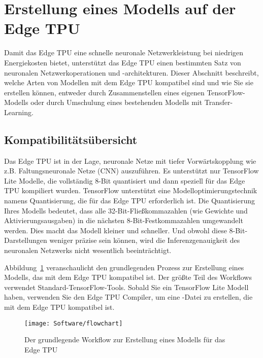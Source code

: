 \section{Erstellung eines Modells  auf der Edge TPU}
Damit das Edge TPU eine schnelle neuronale Netzwerkleistung bei niedrigen Energiekosten bietet, unterstützt das Edge TPU einen bestimmten Satz von neuronalen Netzwerkoperationen und -architekturen. Dieser Abschnitt beschreibt, welche Arten von Modellen mit dem Edge TPU kompatibel sind und wie Sie sie erstellen können, entweder durch Zusammenstellen eines eigenen TensorFlow-Modells oder durch Umschulung eines bestehenden Modells mit Transfer-Learning.

\subsection{Kompatibilitätsübersicht}

Das Edge TPU ist in der Lage, neuronale Netze mit tiefer Vorwärtskopplung wie z.B. Faltungsneuronale Netze (CNN) auszuführen. Es unterstützt nur TensorFlow Lite Modelle, die vollständig 8-Bit quantisiert und dann speziell für das Edge TPU kompiliert wurden.
TensorFlow unterstützt eine Modelloptimierungstechnik namens Quantisierung, die für das Edge TPU erforderlich ist. Die Quantisierung Ihres Modells bedeutet, dass alle 32-Bit-Fließkommazahlen (wie Gewichte und Aktivierungsausgaben) in die nächsten 8-Bit-Festkommazahlen umgewandelt werden. Dies macht das Modell kleiner und schneller. Und obwohl diese 8-Bit-Darstellungen weniger präzise sein können, wird die Inferenzgenauigkeit des neuronalen Netzwerks nicht wesentlich beeinträchtigt.

\bigskip

Abbildung~\ref{Software:Flowchart} veranschaulicht den grundlegenden Prozess zur Erstellung eines Modells, das mit dem Edge TPU kompatibel ist. Der größte Teil des Workflows verwendet Standard-TensorFlow-Tools. Sobald Sie ein TensorFlow Lite Modell haben, verwenden Sie den Edge TPU Compiler, um eine -Datei zu erstellen, die mit dem Edge TPU kompatibel ist.

\begin{figure}[!h]
	\centering
	\texttt{[image: Software/flowchart]} 
	
	\caption{Der grundlegende Workflow zur Erstellung eines Modells 
		für das Edge TPU\cite{GoogleTensorFlowModel:2019}}\label{Software:Flowchart}
\end{figure}

